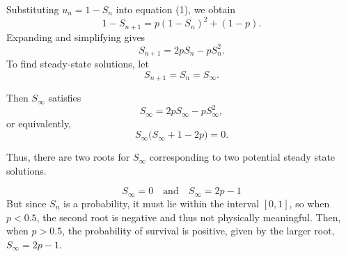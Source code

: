 \documentclass[11pt,a4paper]{article}
\theoremstyle{plain}
\theoremstyle{definition}
\begin{document}
Substituting $u_n = 1 - S_n$ into equation (1), we obtain
\[
1 - S_{n+1} = p (1 - S_n)^2 + (1 - p).
\]
Expanding and simplifying gives
\[
S_{n+1}
= 2p S_n - p S_n^2.
\]
To find steady-state solutions, let
\[
S_{n+1} = S_n = S_\infty.
\]
\begin{figure}
    \centering
    \vspace{-10pt} %
    \vspace{35pt}
\end{figure}
Then $S_\infty$ satisfies
\[
S_\infty = 2p S_\infty - p S_\infty^2,
\]
or equivalently,
\[
S_\infty \bigl( S_\infty + 1 - 2p \bigr) = 0.
\]


Thus, there are two roots for $S_\infty$ corresponding to two potential steady state solutions.

$$S_\infty = 0 \quad \text{and} \quad S_\infty = 2p - 1$$
But since $S_n$ is a probability, it must lie within the interval $[0,1]$, so when $p < 0.5$, the second root is negative and thus not physically meaningful.
Then, when $p > 0.5$, the probability of survival is positive, given by the larger root, $S_\infty = 2p - 1$. 
\end{document}
